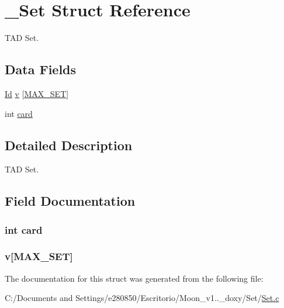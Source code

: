 \hypertarget{struct___set}{\section{\+\_\+\+Set Struct Reference}
\label{struct___set}
}


T\+A\+D Set.  


\subsection*{Data Fields}
\begin{DoxyCompactItemize}
\item 
\hyperlink{_types_8h_a845e604fb28f7e3d97549da3448149d3}{Id} \hyperlink{struct___set_ae3cfeba7aa7700635730154218305d29}{v} \mbox{[}\hyperlink{_set_8h_abc21882f4958e6b56aaf2f3c18f80d43}{M\+A\+X\+\_\+\+S\+E\+T}\mbox{]}
\item 
int \hyperlink{struct___set_acd789e381a684163a021e2d228653afd}{card}
\end{DoxyCompactItemize}


\subsection{Detailed Description}
T\+A\+D Set. 


\begin{DoxyItemize}
\item 
\end{DoxyItemize}

\subsection{Field Documentation}
\hypertarget{struct___set_acd789e381a684163a021e2d228653afd}{
\subsubsection[{card}]{\setlength{\rightskip}{0pt plus 5cm}int card}}\label{struct___set_acd789e381a684163a021e2d228653afd}
\hypertarget{struct___set_ae3cfeba7aa7700635730154218305d29}{
\subsubsection[{v}]{ v\mbox{[}{\bf M\+A\+X\+\_\+\+S\+E\+T}\mbox{]}}}\label{struct___set_ae3cfeba7aa7700635730154218305d29}


The documentation for this struct was generated from the following file\+:\begin{DoxyCompactItemize}
\item 
C\+:/\+Documents and Settings/e280850/\+Escritorio/\+Moon\+\_\+v1..\+\_\+doxy/\+Set/\hyperlink{_set_8c}{Set.\+c}\end{DoxyCompactItemize}
